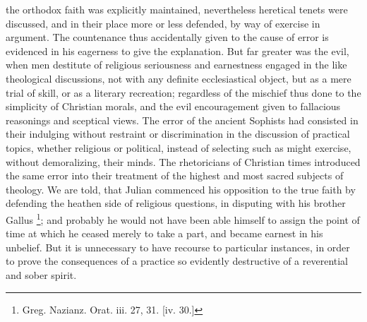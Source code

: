 the orthodox faith was explicitly maintained, nevertheless heretical
tenets were discussed, and in their place more or less defended, by
way of exercise in argument. The countenance thus accidentally given
to the cause of error is evidenced in his eagerness to give the
explanation. But far greater was the evil, when men destitute of
religious seriousness and earnestness engaged in the like theological
discussions, not with any definite ecclesiastical object, but as a
mere trial of skill, or as a literary recreation; regardless of the
mischief thus done to the simplicity of Christian morals, and the evil
encouragement given to fallacious reasonings and sceptical views. The
error of the ancient Sophists had consisted in their indulging without
restraint or discrimination in the discussion of practical topics,
whether religious or political, instead of selecting such as might
exercise, without demoralizing, their minds. The rhetoricians of
Christian times introduced the same error into their treatment of
the highest and most sacred subjects of theology. We are told, that
Julian commenced his opposition to the true faith by defending the
heathen side of religious questions, in disputing with his brother
Gallus \footnote{Greg. Nazianz. Orat. iii. 27, 31. [iv. 30.]}; and probably he would not have been able himself to
assign the point of time at which he ceased merely to take a part, and
became earnest in his unbelief. But it is unnecessary to have recourse
to particular instances, in order to prove the consequences of a
practice so evidently destructive of a reverential and sober spirit.

